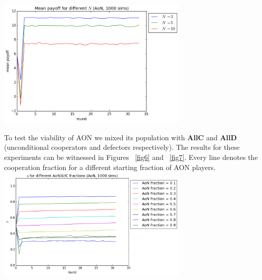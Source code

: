 \documentclass[letterpaper]{article}
\begin{document}
\includegraphics[width=3.6in,angle=0]{img/meanpayoff_N_aon.png}
\label{fig5}
\vspace{5 mm}



To test the viability of AON we mixed its population with \textbf{AllC} and \textbf{AllD} (unconditional cooperators and defectors respectively). The results for these experiments can be witnessed in Figures ~\ref{fig6} and ~\ref{fig7}. Every line denotes the cooperation fraction for a different starting fraction of AON players. 
\includegraphics[width=3.6in,angle=0]{img/cfraction_AONAllCfractions_aon.png}
\label{fig6}
\vspace{5 mm}
\end{document}
